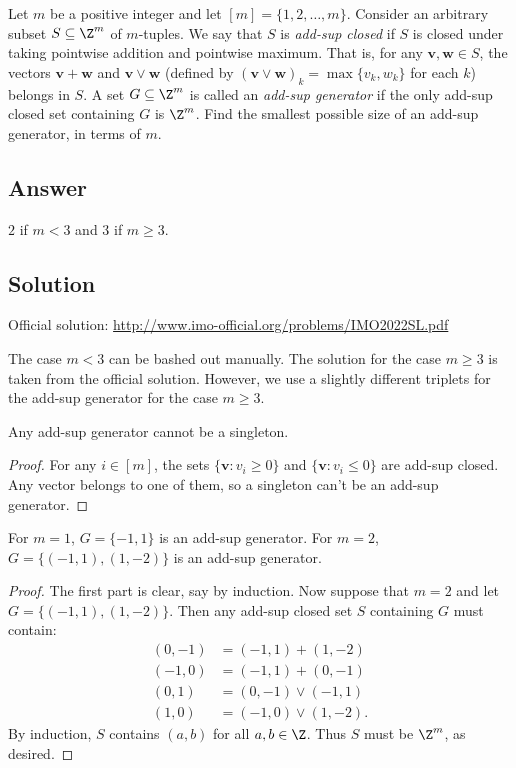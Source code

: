 Let $m$ be a positive integer and let $[m] = \{1, 2, \ldots, m\}$.
Consider an arbitrary subset $S \subseteq \Z^m$ of $m$-tuples.
We say that $S$ is \emph{add-sup closed} if $S$ is closed under taking pointwise addition and pointwise maximum.
That is, for any $\mathbf{v}, \mathbf{w} \in S$, the vectors $\mathbf{v} + \mathbf{w}$ and $\mathbf{v} \vee \mathbf{w}$ (defined by $(\mathbf{v} \vee \mathbf{w})_k = \max\{v_k, w_k\}$ for each $k$) belongs in $S$.
A set $G \subseteq \Z^m$ is called an \emph{add-sup generator} if the only add-sup closed set containing $G$ is $\Z^m$.
Find the smallest possible size of an add-sup generator, in terms of $m$.



\subsection*{Answer}

$2$ if $m < 3$ and $3$ if $m \geq 3$.



\subsection*{Solution}

Official solution: \url{http://www.imo-official.org/problems/IMO2022SL.pdf}

The case $m < 3$ can be bashed out manually.
The solution for the case $m \geq 3$ is taken from the official solution.
However, we use a slightly different triplets for the add-sup generator for the case $m \geq 3$.

\begin{lemma}\label{2022c7-1}
Any add-sup generator cannot be a singleton.
\end{lemma}
\begin{proof}
For any $i \in [m]$, the sets $\{\mathbf{v} : v_i \geq 0\}$ and $\{\mathbf{v} : v_i \leq 0\}$ are add-sup closed.
Any vector belongs to one of them, so a singleton can't be an add-sup generator.
\end{proof}

\begin{lemma}\label{2022c7-2}
For $m = 1$, $G = \{-1, 1\}$ is an add-sup generator.
For $m = 2$, $G = \{(-1, 1), (1, -2)\}$ is an add-sup generator.
\end{lemma}
\begin{proof}
The first part is clear, say by induction.
Now suppose that $m = 2$ and let $G = \{(-1, 1), (1, -2)\}$.
Then any add-sup closed set $S$ containing $G$ must contain:
\begin{align*}
    (0, -1) &= (-1, 1) + (1, -2) \\
    (-1, 0) &= (-1, 1) + (0, -1) \\
    (0, 1) &= (0, -1) \vee (-1, 1) \\
    (1, 0) &= (-1, 0) \vee (1, -2).
\end{align*}
By induction, $S$ contains $(a, b)$ for all $a, b \in \Z$.
Thus $S$ must be $\Z^m$, as desired.
\end{proof}

